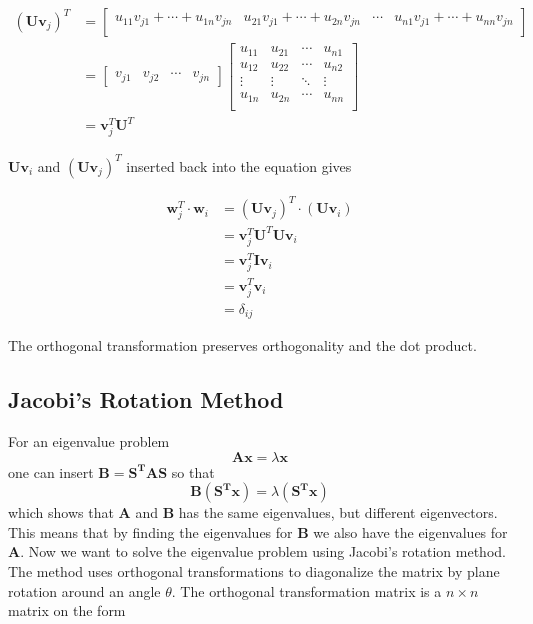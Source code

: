 \documentclass{article}
\begin{document}
\begin{equation*}
\begin{split}
(\mathbf{Uv}_j)^T&=\begin{bmatrix}
u_{11}v_{j1} + \cdots + u_{1n}v_{jn} &
u_{21}v_{j1} +  \cdots + u_{2n}v_{jn} &
\cdots &
u_{n1}v_{j1} + \cdots + u_{nn}v_{jn}\\
\end{bmatrix}\\
&=\begin{bmatrix}
v_{j1} &
v_{j2} &
\cdots &
v_{jn}
\end{bmatrix}\begin{bmatrix}
u_{11} & u_{21} & \cdots & u_{n1}\\
u_{12} & u_{22} & \cdots & u_{n2}\\
\vdots & \vdots & \ddots & \vdots\\
u_{1n} & u_{2n} & \cdots & u_{nn}\\
\end{bmatrix} \\
&=\mathbf{v}_j^T\mathbf{U}^T
\end{split}
\end{equation*}

$\mathbf{Uv}_i$ and $(\mathbf{Uv}_j)^T$ inserted back into the equation gives

\begin{equation*}
\begin{split}
\mathbf{w}_j^T\cdot \mathbf{w}_i&=(\mathbf{Uv}_j)^T\cdot (\mathbf{Uv}_i)\\
&=\mathbf{v}_j^T\mathbf{U}^T\mathbf{Uv}_i\\
&=\mathbf{v}_j^T\mathbf{I}\mathbf{v}_i\\
&=\mathbf{v}_j^T\mathbf{v}_i\\
&=\delta_{ij}
\end{split}
\end{equation*}

The orthogonal transformation preserves orthogonality and the dot product.

\subsection{Jacobi's Rotation Method}
For an eigenvalue problem
$$\mathbf{Ax}=\lambda\mathbf{x}$$
one can insert $\mathbf{B}=\mathbf{S^TAS}$ so that
$$\mathbf{B(S^Tx)}=\lambda(\mathbf{S^Tx})$$
which shows that $\mathbf{A}$ and $\mathbf{B}$ has the same eigenvalues, but different eigenvectors. This means that by finding the eigenvalues for $\mathbf{B}$ we also have the eigenvalues for $\mathbf{A}$.
\vskip0.5cm
Now we want to solve the eigenvalue problem using Jacobi's rotation method. The method uses orthogonal transformations to diagonalize the matrix by plane rotation around an angle $\theta$. The orthogonal transformation matrix is a $n\times n$ matrix on the form
\end{document}
